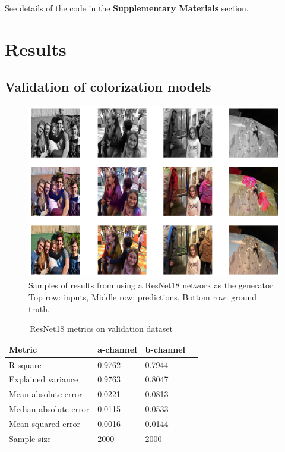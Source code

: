 \documentclass[
]{article}
\begin{document}
See details of the code in the \textbf{Supplementary Materials} section.

\hypertarget{results}{%
\section{Results}\label{results}}

\hypertarget{validation-of-colorization-models}{%
\subsection{Validation of colorization
models}\label{validation-of-colorization-models}}

\begin{figure}
\centering
\includegraphics{results/ResNet18.png}
\caption{Samples of results from using a ResNet18 network as the
generator. Top row: inputs, Middle row: predictions, Bottom row: ground
truth.}
\label{fig:resnet18}
\end{figure}

\begin{table}\centering\caption[Metrics of ResNet18 generator on validation dataset]{ResNet18 metrics on validation dataset}\label{table:resnet18-metrics}\begin{tabular}{llll}\toprule{}                 Metric &              a-channel &             b-channel \\\midrule                R-square &     0.9762 &    0.7944 \\     Explained variance &     0.9763 &    0.8047 \\    Mean absolute error &   0.0221 &   0.0813 \\  Median absolute error &   0.0115 &  0.0533 \\     Mean squared error &  0.0016 &  0.0144 \\            Sample size &                   2000 &                  2000 \\\bottomrule\end{tabular}\end{table}
\end{document}
